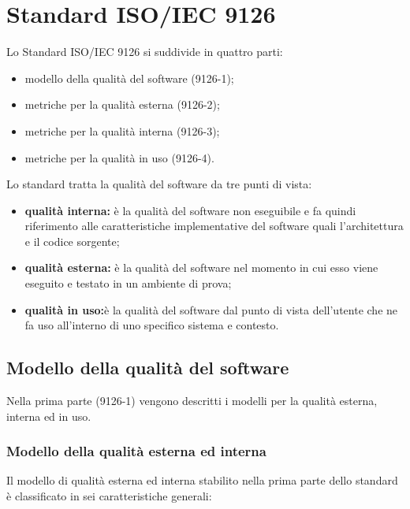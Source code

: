 \documentclass[PianoDiQualifica.tex]{subfiles}
\begin{document}
\hypertarget{ISOIEC}{\section{Standard ISO/IEC 9126}}
Lo Standard ISO/IEC 9126 si suddivide in quattro parti:
\begin{itemize}
\item modello della qualità del software (9126-1);
\item metriche per la qualità esterna (9126-2);
\item metriche per la qualità interna (9126-3);
\item metriche per la qualità in uso (9126-4).
\end{itemize}

Lo standard tratta la qualità del software da tre punti di vista:
\begin{itemize}
\item \textbf{qualità interna:}  è la qualità del software non eseguibile e
fa quindi riferimento alle caratteristiche implementative del software
quali l’architettura e il codice sorgente;
\item \textbf{qualità esterna:} è la qualità del software nel
momento in cui esso viene eseguito e testato in un ambiente di prova;
\item \textbf{qualità in uso:}è la qualità del software dal punto di vista dell’utente che ne fa uso all’interno di uno specifico sistema e contesto.
\end{itemize}
\subsection{Modello della qualità del software}
Nella prima parte (9126-1) vengono descritti i modelli per la qualità esterna, interna
ed in uso.

\subsubsection{Modello della qualità esterna ed interna}

Il modello di qualità esterna ed interna stabilito nella prima parte dello
standard è classificato in sei caratteristiche generali:
\end{document}
